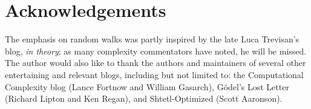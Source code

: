 \documentclass[12pt]{article}
\theoremstyle{definition}
\begin{document}
\section{Acknowledgements}

The emphasis on random walks was partly inspired by the late Luca Trevisan's
blog, {\em in theory};
as many complexity commentators have noted, he will be missed.
The author would also like to thank the authors and maintainers of
several other entertaining and relevant blogs, including but
not limited to: the Computational Complexity blog
(Lance Fortnow and William Gasarch),
G\"odel's Lost Letter (Richard Lipton and Ken Regan),
and Shtetl-Optimized (Scott Aaronson).



\end{document}
